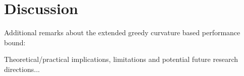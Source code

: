 \documentclass[letterpaper, 10 pt, conference]{ieeeconf}
\begin{document}








\section{Discussion}\label{Sec:Discussion}

Additional remarks about the extended greedy curvature based performance bound: 

Theoretical/practical implications, limitations and potential future research directions...





\end{document}

